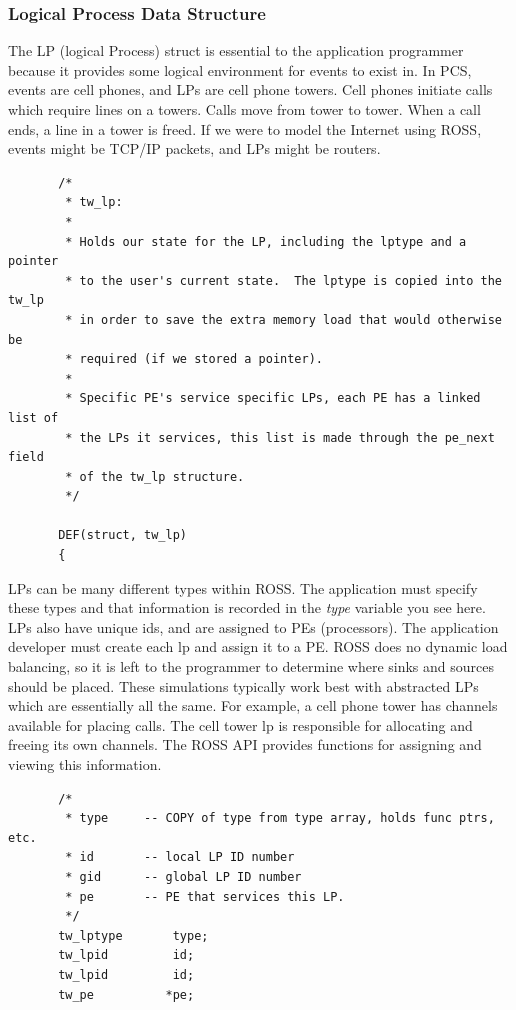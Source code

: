 \documentclass[12pt]{article}
\begin{document}
\subsubsection{Logical Process Data Structure}
The LP (logical Process) struct is essential to the application
programmer because it provides some logical environment for events to
exist in.  In PCS, events are cell phones, and LPs are cell phone
towers.  Cell phones initiate calls which require lines on a towers.
Calls move from tower to tower.  When a call ends, a line in a tower
is freed.  If we were to model the Internet using ROSS, events might
be TCP/IP packets, and LPs might be routers.

\begin{verbatim}
       /*
        * tw_lp:
        *
        * Holds our state for the LP, including the lptype and a pointer
        * to the user's current state.  The lptype is copied into the tw_lp
        * in order to save the extra memory load that would otherwise be
        * required (if we stored a pointer).
        *
        * Specific PE's service specific LPs, each PE has a linked list of
        * the LPs it services, this list is made through the pe_next field
        * of the tw_lp structure.
        */

       DEF(struct, tw_lp)
       {
\end{verbatim}
 
LPs can be many different types within ROSS.  The application must specify
these types and that information is recorded in the {\em type} variable you
see here.  LPs also have unique ids, and are assigned to PEs (processors).
The application developer must create each lp and assign it to a PE.  ROSS
does no dynamic load balancing, so it is left to the programmer to determine
where sinks and sources should be placed.  These simulations typically work
best with abstracted LPs which are essentially all the same.  For example, a
cell phone tower has channels available for placing calls.  The cell tower lp
is responsible for allocating and freeing its own channels.  The ROSS API
provides functions for assigning and viewing this information.

\begin{verbatim} 
       /*
        * type     -- COPY of type from type array, holds func ptrs, etc.
        * id       -- local LP ID number
        * gid      -- global LP ID number
        * pe       -- PE that services this LP.
        */
       tw_lptype       type;
       tw_lpid         id;
       tw_lpid         id;
       tw_pe          *pe;
\end{verbatim}
 
\end{document}
